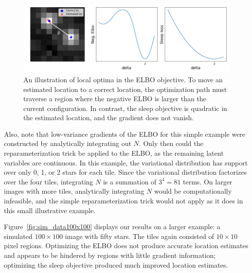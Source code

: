 \begin{figure}[!htb]
    \centering
    \includegraphics[width=\textwidth]{figures/local_minima_cartoon.png}
    \caption{An illustration of local optima in the ELBO objective. 
    To move an estimated location to a correct location, 
    the optimization path must traverse a region where the negative ELBO is larger than the current configuration. 
    In contrast, the sleep objective is quadratic in the estimated location, and the gradient does not vanish. }
    \label{fig:local_optima_cartoon}
\end{figure}

Also, note that low-variance gradients of the ELBO for this simple example were constructed by analytically integrating out $N$. Only then could the reparameterization trick be applied to the ELBO, as the remaining latent variables are continuous. 
In this example, the variational distribution has support over only 0, 1, or 2 stars for each tile. 
Since the variational distribution factorizes over the four tiles, integrating $N$ is a summation of $3^4 = 81$ terms.
On larger images with more tiles, analytically integrating $N$ would be computationally infeasible, 
and the simple reparameterization trick would not apply as it does in this small illustrative example. 

Figure~\ref{fig:sim_data100x100} displays our results on a larger example: a simulated $100\times 100$ image with fifty stars. 
The tiles again consisted of $10\times 10$ pixel regions. 
Optimizing the ELBO does not produce accurate location estimates and appears to be hindered by regions with little gradient information; optimizing the sleep objective produced much improved location estimates.



